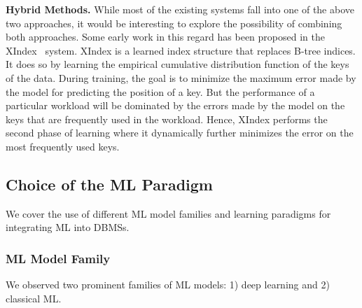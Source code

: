 \vspace{2mm}
\noindent \textbf{Hybrid Methods.} While most of the existing systems fall into one of the above two approaches, it would be interesting to explore the possibility of combining both approaches.
Some early work in this regard has been proposed in the XIndex~\cite{xindex} system.
XIndex is a learned index structure that replaces B-tree indices.
It does so by learning the empirical cumulative distribution function of the keys of the data.
During training, the goal is to minimize the maximum error made by the model for predicting the position of a key.
But the performance of a particular workload will be dominated by the errors made by the model on the keys that are frequently used in the workload.
Hence, XIndex performs the second phase of learning where it dynamically further minimizes the error on the most frequently used keys.


\subsection{Choice of the ML Paradigm}
We cover the use of different ML model families and learning paradigms for integrating ML into DBMSs.

\subsubsection{ML Model Family}
We observed two prominent families of ML models: 1) deep learning and 2) classical ML.

